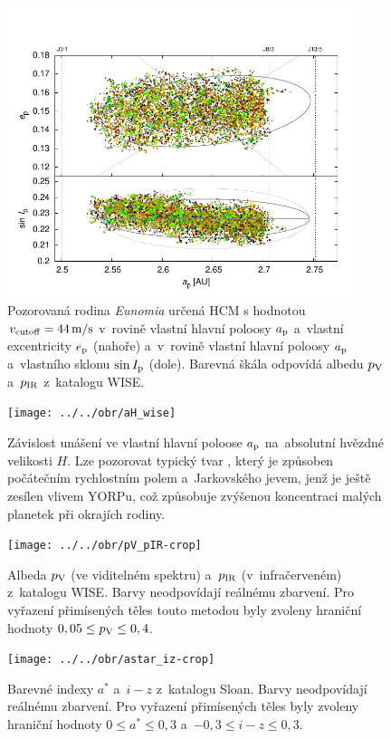 \documentclass[a4paper, 12pt]{article}
\begin{document}
\begin{figure}
	\centering
	\includegraphics[width=0.9\textwidth]{../../obr/ae_ai_wise}
	\caption{Pozorovaná rodina \textit{Eunomia} určená HCM s hodnotou $v_{\rm cutoff} = 44\,{\rm m/s}$ v~rovině vlastní hlavní poloosy $a_{\rm p}$ a~vlastní excentricity $e_{\rm p}$ (nahoře) a~v~rovině vlastní hlavní poloosy $a_{\rm p}$ a~vlastního sklonu $\sin I_{\rm p}$ (dole). Barevná škála odpovídá albedu $p_{\rm V}$ a~$p_{\rm IR}$ z~katalogu WISE.}
	\label{fig:ae_ai_wise}
\end{figure}
\begin{figure}
	\centering
	\texttt{[image: ../../obr/aH\_wise]}
	\caption{Závislost unášení ve vlastní hlavní poloose $a_{\rm p}$ na~absolutní hvězdné velikosti $H$. Lze pozorovat typický tvar , který je způsoben počátečním rychlostním polem a~Jarkovského jevem, jenž je ještě zesílen vlivem YORPu, což způsobuje zvýšenou koncentraci malých planetek při okrajích rodiny.\newline\newline}
\end{figure}
\begin{figure}
	\centering
	\texttt{[image: ../../obr/pV\_pIR-crop]}
	\caption{Albeda $p_{\rm V}$ (ve viditelném spektru) a~$p_{\rm IR}$ (v~infračerveném) z~katalogu WISE. Barvy neodpovídají reálnému zbarvení. Pro vyřazení přimísených těles touto metodou byly zvoleny hraniční hodnoty $0,05 \leq p_{\rm V} \leq 0,4$.\newline}
	\centering
	\texttt{[image: ../../obr/astar\_iz-crop]}
	\caption{Barevné indexy $a^*$ a~$i-z$ z~katalogu Sloan. Barvy neodpovídají reálnému zbarvení. Pro vyřazení přimísených těles byly zvoleny hraniční hodnoty $0\leq a^* \leq 0,3$ a~$-0,3\leq i-z \leq 0,3$.\newline\newline}
\end{figure}
\clearpage
\end{document}

